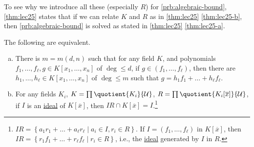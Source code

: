 To see why we introduce all these (especially \(R\)) for \autoref{prb:algebraic-bound}, \autoref{thm:lec25} states that if we can relate \(K\) and \(R\) as in \autoref{thm:lec25} \autoref{thm:lec25-b}, then \autoref{prb:algebraic-bound} is solved as stated in \autoref{thm:lec25} \autoref{thm:lec25-a}.

\begin{theorem}\label{thm:lec25}
	The following are equivalent.
	\begin{enumerate}[(a)]
		\item\label{thm:lec25-a} There is \(m = m(d, n)\) such that for any field \(K\), and polynomials \(f_1, \dots , f_{\ell }, g\in K[x_1, \dots , x_n]\) of \(\deg \leq d\), if \(g\in (f_1, \dots , f_{\ell } )\), then there are \(h_1, \dots , h_{\ell } \in K[x_1, \dots , x_n]\) of \(\deg \leq m\) such that \(g = h_1 f_1 + \dots + h_{\ell } f_{\ell } \).
		\item\label{thm:lec25-b} For any fields \(K_i\), \(K = \prod \quotient{K_i}{\mathcal{U} } \), \(R = \prod \quotient{K_i[\overline{x} ]}{\mathcal{U} } \), if \(I\) is an \hyperref[def:ideal]{ideal} of \(K[\overline{x} ]\), then \(IR \cap K[\overline{x} ] = I\).\footnote{\(IR = \left\{ a_1 r_1 + \dots + a_{\ell }  r_{\ell }  \mid a_i \in I, r_i \in R \right\} \). If \(I = (f_1, \dots , f_{\ell } )\) in \(K[\overline{x} ]\), then \(IR = \left\{ r_1 f_1 + \dots + r_{\ell }  f_{\ell }  \mid r_i\in R\right\} \), i.e., the \hyperref[def:ideal]{ideal} generated by \(I\) in \(R\).}
	\end{enumerate}
\end{theorem}
